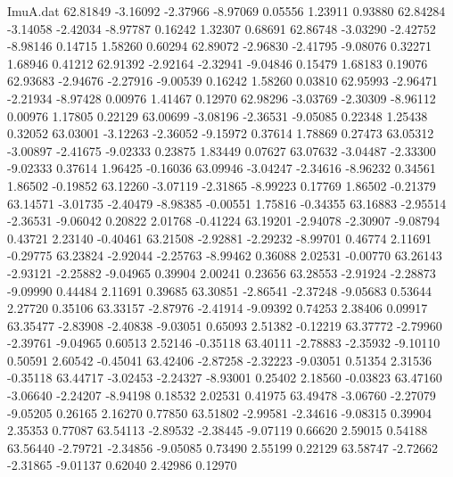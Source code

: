 \begin{filecontents}{ImuA.dat}
  62.81849   -3.16092   -2.37966   -8.97069    0.05556    1.23911    0.93880
  62.84284   -3.14058   -2.42034   -8.97787    0.16242    1.32307    0.68691
  62.86748   -3.03290   -2.42752   -8.98146    0.14715    1.58260    0.60294
  62.89072   -2.96830   -2.41795   -9.08076    0.32271    1.68946    0.41212
  62.91392   -2.92164   -2.32941   -9.04846    0.15479    1.68183    0.19076
  62.93683   -2.94676   -2.27916   -9.00539    0.16242    1.58260    0.03810
  62.95993   -2.96471   -2.21934   -8.97428    0.00976    1.41467    0.12970
  62.98296   -3.03769   -2.30309   -8.96112    0.00976    1.17805    0.22129
  63.00699   -3.08196   -2.36531   -9.05085    0.22348    1.25438    0.32052
  63.03001   -3.12263   -2.36052   -9.15972    0.37614    1.78869    0.27473
  63.05312   -3.00897   -2.41675   -9.02333    0.23875    1.83449    0.07627
  63.07632   -3.04487   -2.33300   -9.02333    0.37614    1.96425   -0.16036
  63.09946   -3.04247   -2.34616   -8.96232    0.34561    1.86502   -0.19852
  63.12260   -3.07119   -2.31865   -8.99223    0.17769    1.86502   -0.21379
  63.14571   -3.01735   -2.40479   -8.98385   -0.00551    1.75816   -0.34355
  63.16883   -2.95514   -2.36531   -9.06042    0.20822    2.01768   -0.41224
  63.19201   -2.94078   -2.30907   -9.08794    0.43721    2.23140   -0.40461
  63.21508   -2.92881   -2.29232   -8.99701    0.46774    2.11691   -0.29775
  63.23824   -2.92044   -2.25763   -8.99462    0.36088    2.02531   -0.00770
  63.26143   -2.93121   -2.25882   -9.04965    0.39904    2.00241    0.23656
  63.28553   -2.91924   -2.28873   -9.09990    0.44484    2.11691    0.39685
  63.30851   -2.86541   -2.37248   -9.05683    0.53644    2.27720    0.35106
  63.33157   -2.87976   -2.41914   -9.09392    0.74253    2.38406    0.09917
  63.35477   -2.83908   -2.40838   -9.03051    0.65093    2.51382   -0.12219
  63.37772   -2.79960   -2.39761   -9.04965    0.60513    2.52146   -0.35118
  63.40111   -2.78883   -2.35932   -9.10110    0.50591    2.60542   -0.45041
  63.42406   -2.87258   -2.32223   -9.03051    0.51354    2.31536   -0.35118
  63.44717   -3.02453   -2.24327   -8.93001    0.25402    2.18560   -0.03823
  63.47160   -3.06640   -2.24207   -8.94198    0.18532    2.02531    0.41975
  63.49478   -3.06760   -2.27079   -9.05205    0.26165    2.16270    0.77850
  63.51802   -2.99581   -2.34616   -9.08315    0.39904    2.35353    0.77087
  63.54113   -2.89532   -2.38445   -9.07119    0.66620    2.59015    0.54188
  63.56440   -2.79721   -2.34856   -9.05085    0.73490    2.55199    0.22129
  63.58747   -2.72662   -2.31865   -9.01137    0.62040    2.42986    0.12970

\end{filecontents}
